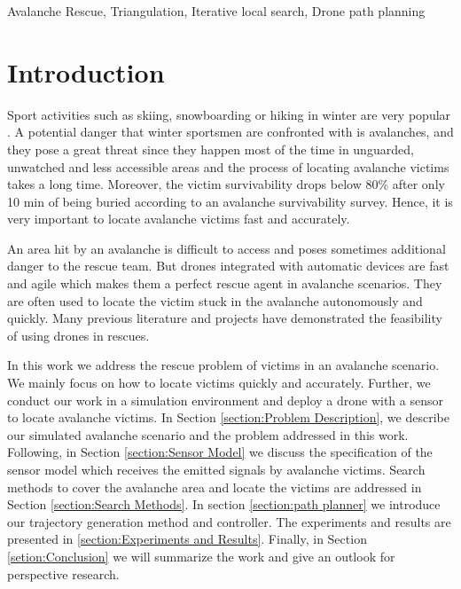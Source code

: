 \documentclass[conference]{IEEEtran}
\begin{document}
\begin{IEEEkeywords}
Avalanche Rescue, Triangulation, Iterative local search, Drone path planning
\end{IEEEkeywords}

\section{Introduction}
Sport activities such as skiing, snowboarding or hiking in winter are very popular \cite{winter-pop1}\cite{winter-pop2}. A potential danger that winter sportsmen are confronted with is avalanches, and they pose a great threat since they happen most of the time in unguarded, unwatched and less accessible areas and the process of locating avalanche victims takes a long time. Moreover, the victim survivability drops below 80\% after only 10 min of being buried according to an avalanche survivability survey\cite{article}. Hence, it is very important to locate avalanche victims fast and accurately. 


An area hit by an avalanche is difficult to access and poses sometimes additional danger to the rescue team. But drones integrated with automatic devices are fast and agile which makes them a perfect rescue agent in avalanche scenarios. They are often used to locate the victim stuck in the avalanche autonomously and quickly. Many previous literature and projects \cite{doi:10.1080/19475705.2016.1238852}\cite{avalanche-rescue-drone1}\cite{avalanche-rescue-drone2} have demonstrated the feasibility of using drones in rescues.

In this work we address the rescue problem of victims in an avalanche scenario. We mainly focus on how to locate victims quickly and accurately. Further, we conduct our work in a simulation environment and deploy a drone with a sensor to locate avalanche victims. In Section \ref{section:Problem Description}, we describe our simulated avalanche scenario and the problem addressed in this work. Following, in Section \ref{section:Sensor Model} we discuss the specification of the sensor model which receives the emitted signals by avalanche victims. Search methods to cover the avalanche area and locate the victims are addressed in Section \ref{section:Search Methods}. In section \ref{section:path planner} we introduce our trajectory generation method and controller. The experiments and results are presented in \ref{section:Experiments and Results}. Finally, in Section \ref{setion:Conclusion} we will summarize the work and give an outlook for perspective research.  
\end{document}
